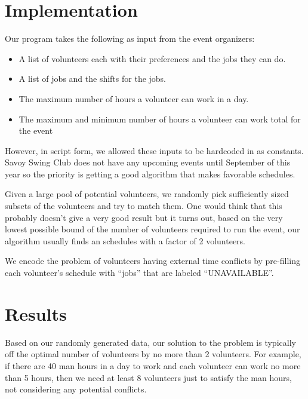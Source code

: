 \documentclass[12pt]{article}
\theoremstyle{definition}
\begin{document}
\begin{multicols}{2}
\section{Implementation}
Our program takes the following as input from the event organizers:
\begin{itemize}
\item A list of volunteers each with their preferences and the jobs they can do.
\item A list of jobs and the shifts for the jobs.
\item The maximum number of hours a volunteer can work in a day.
\item The maximum and minimum number of hours a volunteer can work total for the event
\end{itemize}
However, in script form, we allowed these inputs to be hardcoded in as constants.
Savoy Swing Club does not have any upcoming events until September of this year so the priority is getting a good algorithm that makes favorable schedules.

Given a large pool of potential volunteers, we randomly pick sufficiently sized subsets of the volunteers and try to match them.
One would think that this probably doesn't give a very good result but it turns out, based on the very lowest possible bound of the number of volunteers required to run the event, our algorithm usually finds an schedules with a factor of 2 volunteers.

We encode the problem of volunteers having external time conflicts by pre-filling each volunteer's schedule with ``jobs'' that are labeled ``UNAVAILABLE''.

\section{Results}
Based on our randomly generated data, our solution to the problem is typically off the optimal number of volunteers by no more than 2 volunteers.
For example, if there are 40 man hours in a day to work and each volunteer can work no more than 5 hours, then we need at least 8 volunteers just to satisfy the man hours, not considering any potential conflicts.


\end{multicols}
\end{document}
